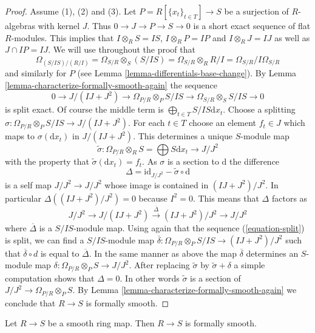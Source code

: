 \begin{proof}
Assume (1), (2) and (3).
Let $P = R[\{x_t\}_{t \in T}] \to S$ be a surjection of $R$-algebras
with kernel $J$. Thus $0 \to J \to P \to S \to 0$ is a
short exact sequence of flat $R$-modules. This implies that
$I \otimes_R S = IS$, $I \otimes_R P = IP$ and $I \otimes_R J = IJ$
as well as $J \cap IP = IJ$.
We will use throughout the proof that
$$
\Omega_{(S/IS)/(R/I)} = \Omega_{S/R} \otimes_S (S/IS)
= \Omega_{S/R} \otimes_R R/I = \Omega_{S/R} / I\Omega_{S/R}
$$
and similarly for $P$ (see Lemma \ref{lemma-differentials-base-change}).
By Lemma \ref{lemma-characterize-formally-smooth-again} the sequence
\begin{equation}
\label{equation-split}
0 \to J/(IJ + J^2) \to
\Omega_{P/R} \otimes_P S/IS \to
\Omega_{S/R} \otimes_S S/IS \to 0
\end{equation}
is split exact. Of course the middle term is
$\bigoplus_{t \in T} S/IS \text{d}x_t$. Choose a splitting
$\sigma : \Omega_{P/R} \otimes_P S/IS \to J/(IJ + J^2)$.
For each $t \in T$ choose an element $f_t \in J$ which maps
to $\sigma(\text{d}x_t)$ in $J/(IJ + J^2)$. This determines a
unique $S$-module map
$$
\tilde \sigma : \Omega_{P/R} \otimes_R S
= \bigoplus S\text{d}x_t \longrightarrow J/J^2
$$
with the property that $\tilde\sigma(\text{d}x_t) = f_t$.
As $\sigma$ is a section to $\text{d}$ the difference
$$
\Delta = \text{id}_{J/J^2} - \tilde \sigma \circ \text{d}
$$
is a self map $J/J^2 \to J/J^2$ whose image is contained in
$(IJ + J^2)/J^2$. In particular $\Delta((IJ + J^2)/J^2) = 0$
because $I^2 = 0$. This means that $\Delta$ factors as
$$
J/J^2 \to J/(IJ + J^2) \xrightarrow{\overline{\Delta}}
(IJ + J^2)/J^2 \to J/J^2
$$
where $\overline{\Delta}$ is a $S/IS$-module map.
Using again that the sequence (\ref{equation-split})
is split, we can find a $S/IS$-module map
$\overline{\delta} : \Omega_{P/R} \otimes_P S/IS \to (IJ + J^2)/J^2$
such that $\overline{\delta} \circ d$ is equal to $\overline{\Delta}$.
In the same manner as above the map $\overline{\delta}$ determines
an $S$-module map
$\delta : \Omega_{P/R} \otimes_P S \to J/J^2$.
After replacing $\tilde \sigma$ by $\tilde \sigma + \delta$
a simple computation shows that $\Delta = 0$. In other words $\tilde \sigma$
is a section of $J/J^2 \to \Omega_{P/R} \otimes_P S$.
By Lemma \ref{lemma-characterize-formally-smooth-again}
we conclude that $R \to S$ is formally smooth.
\end{proof}


\begin{lemma}
\label{lemma-smooth-formally-smooth}
Let $R \to S$ be a smooth ring map.
Then $R \to S$ is formally smooth.
\end{lemma}

